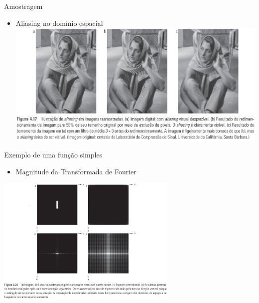       \begin{slide}[toc=]{Amostragem}
         \begin{itemize}[type=1]
            \item Aliasing no domínio espacial
               \includegraphics[width=\textwidth]{figs/fig0417}
         \end{itemize}
      \end{slide}
      
      \begin{slide}[toc=]{Exemplo de uma função simples}
         \begin{itemize}[type=1]
            \item Magnitude da Transformada de Fourier
         \end{itemize}
	      \begin{center}
               \includegraphics[width=0.65\textwidth]{figs/fig0424}
	      \end{center}
      \end{slide}
      
